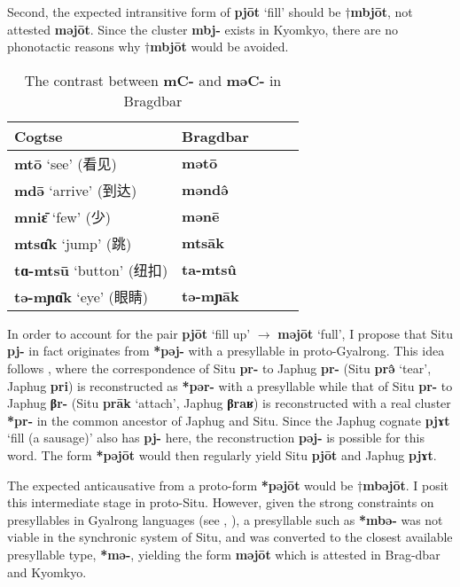 \documentclass[oneside,a4paper,11pt]{article}
\newcommand{\ipa}[1]{\textbf{{\phon\mbox{#1}}}} %
\newcommand{\zh}[1]{{\cn #1}}
\begin{document}
Second, the expected intransitive form of \ipa{pjōt} `fill' should be $\dagger$\ipa{mbjōt}, not attested \ipa{məjōt}. Since the cluster \ipa{mbj-} exists in Kyomkyo, there are no phonotactic reasons why $\dagger$\ipa{mbjōt} would be avoided. 

\begin{table}[H]
\caption{The contrast between \ipa{mC-} and \ipa{məC-} in Bragdbar} \label{tab:mEC} \centering
\begin{tabular}{lllll}
\toprule
Cogtse & Bragdbar   \\
\midrule
\ipa{mtō} `see' (\zh{看见}) & \ipa{mətō}   \\
\ipa{mdə̄} `arrive' (\zh{到达}) & \ipa{məndə̂}    \\
\ipa{mniɛ̄} `few' (\zh{少}) & \ipa{mənē}    \\
\midrule
\ipa{mtsɑ̂k} `jump' (\zh{跳}) & \ipa{mtsāk}    \\
\ipa{tɑ-mtsū} `button' (\zh{纽扣}) & \ipa{ta-mtsû}    \\
\ipa{tə-mɲɑ̄k} `eye' (\zh{眼睛}) & \ipa{tə-mɲāk}    \\
\bottomrule
\end{tabular}
\end{table}

In order to account for the pair \ipa{pjōt} `fill up' $\rightarrow$ \ipa{məjōt} `full', I propose that Situ \ipa{pj-} in fact originates from \ipa{*pəj-} with a presyllable in proto-Gyalrong. This idea follows \citet[263;275;331]{jacques04these}, where the correspondence of Situ \ipa{pr-} to Japhug \ipa{pr-} (Situ \ipa{prə̂} `tear', Japhug \ipa{pri}) is reconstructed as \ipa{*pər-} with a presyllable while that of Situ \ipa{pr-} to Japhug \ipa{βr-} (Situ \ipa{prāk} `attach', Japhug \ipa{βraʁ}) is reconstructed with a real cluster \ipa{*pr-} in the common ancestor of Japhug and Situ. Since the Japhug cognate \ipa{pjɤt} `fill (a sausage)' also has \ipa{pj-} here, the reconstruction \ipa{pəj-} is possible for this word. The form \ipa{*pəjōt} would then regularly yield Situ  \ipa{pjōt} and Japhug  \ipa{pjɤt}.

The expected anticausative from a proto-form \ipa{*pəjōt} would be $\dagger$\ipa{mbəjōt}. I posit this intermediate stage in proto-Situ. However, given the strong constraints on presyllables in Gyalrong languages (see \citealt[1220]{jacques12incorp},  \citealt[92]{jacques12agreement}), a presyllable such as \ipa{*mbə-} was not viable in the synchronic system of Situ, and was converted to the closest available presyllable type, \ipa{*mə-}, yielding the form \ipa{məjōt} which is attested in Brag-dbar and Kyomkyo.
\end{document}

